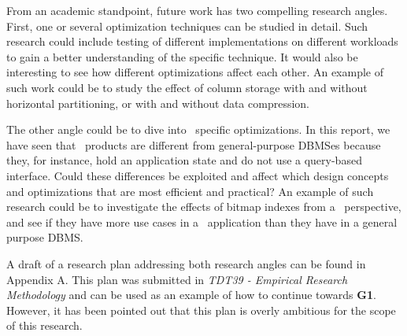 From an academic standpoint, future work has two compelling research angles. First, one or several optimization techniques can be studied in detail. Such research could include testing of different implementations on different workloads to gain a better understanding of the specific technique. It would also be interesting to see how different optimizations affect each other. An example of such work could be to study the effect of column storage with and without horizontal partitioning, or with and without data compression.

The other angle could be to dive into \bd~specific optimizations. In this report, we have seen that \bd~products are different from general-purpose DBMSes because they, for instance, hold an application state and do not use a query-based interface. Could these differences be exploited and affect which design concepts and optimizations that are most efficient and practical? An example of such research could be to investigate the effects of bitmap indexes from a \bd~perspective, and see if they have more use cases in a \bd~application than they have in a general purpose DBMS.

A draft of a research plan addressing both research angles can be found in Appendix A. This plan was submitted in \textit{TDT39 - Empirical Research Methodology} and can be used as an example of how to continue towards \textbf{G1}. However, it has been pointed out that this plan is overly ambitious for the scope of this research.
